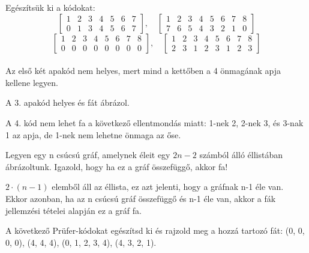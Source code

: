 \begin{solution}
	Egészítsük ki a kódokat: 
	\[
	\begin{bmatrix}1 & 2 & 3 & 4 & 5 & 6 & 7\\
		0 & 1 & 3 & 4 & 5 & 6 & 7
	\end{bmatrix},\quad\begin{bmatrix}1 & 2 & 3 & 4 & 5 & 6 & 7 & 8\\
		7 & 6 & 5 & 4 & 3 & 2 & 1 & 0
	\end{bmatrix}
	\]
	\[
	\begin{bmatrix}1 & 2 & 3 & 4 & 5 & 6 & 7 & 8\\
		0 & 0 & 0 & 0 & 0 & 0 & 0 & 0
	\end{bmatrix},\quad\begin{bmatrix}1 & 2 & 3 & 4 & 5 & 6 & 7 & 8\\
		2 & 3 & 1 & 2 & 3 & 1 & 2 & 3
	\end{bmatrix}
	\]
	\\
	
	Az első két apakód nem helyes, mert mind a kettőben a 4 önmagának
	apja kellene legyen.
	
	A 3. apakód helyes és fát ábrázol.
	
	A 4. kód nem lehet fa a következő ellentmondás miatt: 1-nek 2, 2-nek
	3, és 3-nak 1 az apja, de 1-nek nem lehetne önmaga az őse. 
\end{solution}
\begin{problem}
	Legyen egy n csúcsú gráf, amelynek éleit egy $2n-2$ számból álló
	éllistában ábrázoltunk. Igazold, hogy ha ez a gráf összefüggő, akkor
	fa! 
\end{problem}

\begin{solution}
	$2\cdot(n-1)$ elemből áll az éllista, ez azt jelenti, hogy a gráfnak
	n-1 éle van. Ekkor azonban, ha az n csúcsú gráf összefüggő és n-1
	éle van, akkor a fák jellemzési tételei alapján ez a gráf fa. 
\end{solution}
\begin{problem}
	A következő Prüfer-kódokat egészítsd ki és rajzold meg a hozzá tartozó
	fát: (0, 0, 0, 0), (4, 4, 4), (0, 1, 2, 3, 4), (4, 3, 2, 1). 
\end{problem}


